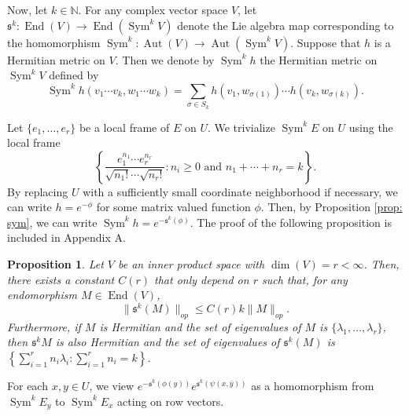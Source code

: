 \documentclass{amsart}
\newtheorem{prop}[thm]{Proposition}
\theoremstyle{definition}
\theoremstyle{remark}
\numberwithin{equation}{section}
\DeclareMathOperator{\Sym}{Sym}
\DeclareMathOperator{\End}{End}
\DeclareMathOperator{\Aut}{Aut}
\begin{document}
Now, let $k \in \mathbb{N}$. For any complex vector space $V$, let $\mathfrak{s}^k : \End(V) \to \End(\Sym^k V)$ denote the Lie algebra map corresponding to the homomorphism $\Sym^k : \Aut(V) \to \Aut(\Sym^k V)$. Suppose that $h$ is a Hermitian metric on $V$. Then we denote by $\Sym^k h$ the Hermitian metric on $\Sym^k V$ defined by 
\begin{equation*}
    \Sym^k h( v_1 \dotsb v_k, w_1 \dotsb w_k) = \sum_{\sigma \in S_k} h(v_1,w_{\sigma(1)}) \dotsb h(v_k,w_{\sigma(k)}).
\end{equation*}


Let $\{e_1, \dotsc, e_r\}$ be a local frame of $E$ on $U$. We trivialize $\Sym^k E$ on $U$ using the local frame
\begin{equation*}
\left\{ \frac{e_{1}^{n_1} \dotsb e_{r}^{n_r}}{\sqrt{n_1 !} \dotsb \sqrt{n_r!}} : n_i \geq 0 \text{ and } n_1 + \dotsb + n_r = k\right \}.
\end{equation*}
By replacing $U$ with a sufficiently small coordinate neighborhood if necessary, we can write $h = e^{-\phi}$ for some matrix valued function $\phi$. Then, by Proposition \ref{prop: sym}, we can write $\Sym^k h = e^{-\mathfrak{s}^k(\phi)}$. The proof of the following proposition is included in Appendix A.
\begin{prop} \label{prop: k}
Let $V$ be an inner product space with $\dim(V) = r < \infty$. Then, there exists a constant $C(r)$ that only depend on $r$ such that, for any endomorphism $M \in \End(V)$,
$$
\|\mathfrak{s}^k(M) \|_{op} \leq C(r)k\|M\|_{op}.
$$
Furthermore, if $M$ is Hermitian and the set of eigenvalues of $M$ is $\{\lambda_1, \dotsc, \lambda_r\}$, then $\mathfrak{s}^k M$ is also Hermitian and the set of eigenvalues of $\mathfrak{s}^k(M)$ is $\left \{ \sum_{i=1}^r n_i \lambda_i : \sum_{i=1}^r n_i = k \right \}$. 
\end{prop}


For each $x,y \in U$, we view $e^{-\mathfrak{s}^k(\phi(y))}e^{\mathfrak{s}^k(\psi(x,\overline{y}))}$ as a homomorphism from $\Sym^k E_y$ to $\Sym^k E_x$ acting on row vectors. 
\end{document}
